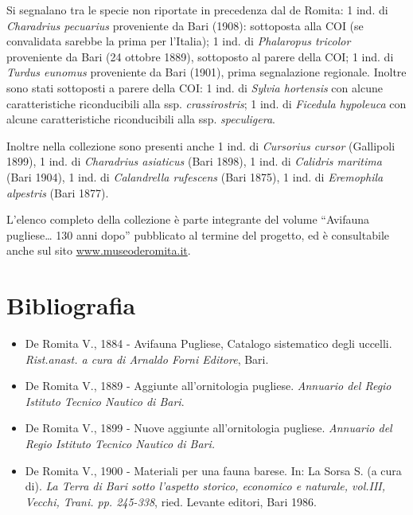 Si segnalano tra le specie non riportate in precedenza dal de Romita: 1
ind. di \textit{Charadrius pecuarius} proveniente da Bari (1908):
sottoposta alla COI (se convalidata sarebbe la prima per
l{\textquoteright}Italia); 1 ind. di \textit{Phalaropus tricolor}
proveniente da Bari (24 ottobre 1889), sottoposto al parere della COI;
1 ind. di \textit{Turdus eunomus} proveniente da Bari (1901), prima
segnalazione regionale. Inoltre sono stati sottoposti a parere della
COI: 1 ind. di \textit{Sylvia hortensis} con alcune caratteristiche
riconducibili alla ssp. \textit{crassirostris}; 1 ind. di
\textit{Ficedula hypoleuca} con alcune caratteristiche riconducibili
alla ssp. \textit{speculigera}.

Inoltre nella collezione sono presenti anche 1 ind. di \textit{Cursorius
cursor} (Gallipoli 1899), 1 ind. di \textit{Charadrius asiaticus} (Bari
1898), 1 ind. di \textit{Calidris maritima} (Bari 1904), 1 ind. di
\textit{Calandrella rufescens} (Bari 1875), 1 ind. di
\textit{Eremophila alpestris} (Bari 1877).

L{\textquoteright}elenco completo della collezione \`e parte integrante
del volume {\textquotedblleft}Avifauna pugliese{\dots} 130 anni
dopo{\textquotedblright} pubblicato al termine del progetto, ed \`e
consultabile anche sul sito
\href{http://www.museoderomita.it}{www.\allowbreak mu\allowbreak se\allowbreak o\allowbreak de\allowbreak ro\allowbreak mi\allowbreak ta.\allowbreak it}.

\section*{Bibliografia}
\begin{itemize}\itemsep0pt
	\item De Romita V., 1884 - Avifauna Pugliese, Catalogo sistematico degli
uccelli. \textit{Rist.anast. a cura di Arnaldo Forni Editore}, Bari. 

	\item De Romita V., 1889 - Aggiunte all'ornitologia pugliese.
\textit{Annuario del Regio Istituto Tecnico Nautico di Bari}. 

	\item De Romita V., 1899 - Nuove aggiunte all'ornitologia
pugliese. \textit{Annuario del Regio Istituto Tecnico Nautico di Bari.}

	\item De Romita V., 1900 - Materiali per una fauna barese. In: La Sorsa S. (a
cura di). \textit{La Terra di Bari sotto l{\textquoteright}aspetto
storico, economico e naturale, vol.III, Vecchi, Trani. pp. 245-338},
ried. Levante editori, Bari 1986. 
\end{itemize}
